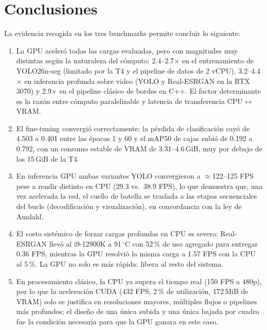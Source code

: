 \section{Conclusiones}

La evidencia recogida en los tres benchmarks permite concluir lo siguiente:

\begin{enumerate}
  \item La GPU aceleró todas las cargas evaluadas, pero con magnitudes muy
        distintas según la naturaleza del cómputo: 2.4--2.7$\times$ en el
        entrenamiento de YOLO26n-seg (limitado por la T4 y el pipeline de
        datos de 2 vCPU), 3.2--4.4$\times$ en inferencia profunda sobre video
        (YOLO y Real-ESRGAN en la RTX 3070) y 2.9$\times$ en el pipeline
        clásico de bordes en C++. El factor determinante es la razón entre
        cómputo paralelizable y latencia de transferencia CPU$\leftrightarrow$VRAM.
  \item El fine-tuning convergió correctamente: la pérdida de clasificación
        cayó de 4.503 a 0.401 entre las épocas 1 y 60 y el mAP50 de cajas
        subió de 0.192 a 0.792, con un consumo estable de VRAM de
        3.31--4.6\,GiB, muy por debajo de los 15\,GiB de la T4.
  \item En inferencia GPU ambas variantes YOLO convergieron a
        $\approx$122--125 FPS pese a rendir distinto en CPU (29.3 vs.\ 38.9
        FPS), lo que demuestra que, una vez acelerada la red, el cuello de
        botella se traslada a las etapas secuenciales del bucle (decodificación
        y visualización), en concordancia con la ley de Amdahl.
  \item El costo sistémico de forzar cargas profundas en CPU es severo:
        Real-ESRGAN llevó al i9-12900K a 91\,$^{\circ}$C con 52\,\% de uso
        agregado para entregar 0.36 FPS, mientras la GPU resolvió la misma
        carga a 1.57 FPS con la CPU al 5\,\%. La GPU no solo es más rápida:
        libera al resto del sistema.
  \item En procesamiento clásico, la CPU ya supera el tiempo real (150 FPS a
        480p), por lo que la aceleración CUDA (432 FPS, 2\,\% de utilización,
        172\,MiB de VRAM) solo se justifica en resoluciones mayores, múltiples
        flujos o pipelines más profundos; el diseño de una única subida y una
        única bajada por cuadro fue la condición necesaria para que la GPU
        ganara en este caso.
\end{enumerate}
